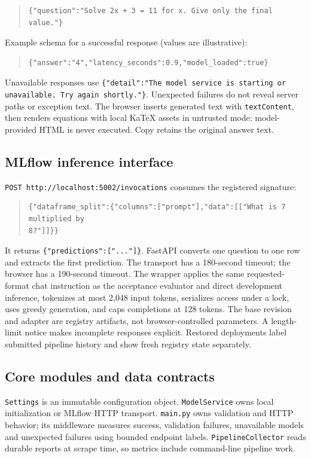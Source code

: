 \documentclass[11pt,a4paper]{article}
\begin{document}
\begin{quote}\small
\begin{verbatim}
{"question":"Solve 2x + 3 = 11 for x. Give only the final value."}
\end{verbatim}
\end{quote}
Example schema for a successful response (values are illustrative):

\begin{quote}\small
\begin{verbatim}
{"answer":"4","latency_seconds":0.9,"model_loaded":true}
\end{verbatim}
\end{quote}
Unavailable responses use \texttt{\{"detail":"The model service is starting or unavailable.\allowbreak{} Try again shortly.\allowbreak{}"\}}. Unexpected failures do not reveal server paths or exception text. The browser inserts generated text with \texttt{textContent}, then renders equations with local KaTeX assets in untrusted mode; model-provided HTML is never executed. Copy retains the original answer text.

\subsection*{MLflow inference interface}
\texttt{POST http:/\allowbreak{}/\allowbreak{}localhost:5002/\allowbreak{}invocations} consumes the registered signature:

\begin{quote}\small
\begin{verbatim}
{"dataframe_split":{"columns":["prompt"],"data":[["What is 7 multiplied by
8?"]]}}
\end{verbatim}
\end{quote}
It returns \texttt{\{"predictions":[".\allowbreak{}.\allowbreak{}.\allowbreak{}"]\}}. FastAPI converts one question to one row and extracts the first prediction. The transport has a 180-second timeout; the browser has a 190-second timeout. The wrapper applies the same requested-format chat instruction as the acceptance evaluator and direct development inference, tokenizes at most 2,048 input tokens, serializes access under a lock, uses greedy generation, and caps completions at 128 tokens. The base revision and adapter are registry artifacts, not browser-controlled parameters. A length-limit notice makes incomplete responses explicit. Restored deployments label submitted pipeline history and show fresh registry state separately.

\subsection*{Core modules and data contracts}
\texttt{Settings} is an immutable configuration object. \texttt{ModelService} owns local initialization or MLflow HTTP transport. \texttt{main.\allowbreak{}py} owns validation and HTTP behavior; its middleware measures success, validation failures, unavailable models and unexpected failures using bounded endpoint labels. \texttt{PipelineCollector} reads durable reports at scrape time, so metrics include command-line pipeline work.
\end{document}
